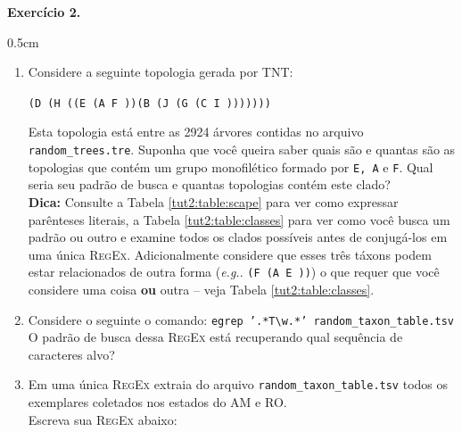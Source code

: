 \begin{refsection}
\begin{blackBlock}{\textbf{Exercício 2.}}\label{tut2:ex:2.\arabic{ex}}
\begin {myindentpar}{0.5cm}
\begin{enumerate}[\itshape i.]
 \item{Considere a seguinte topologia gerada por TNT:}\label{tut2:regex:modifiers:ex1}\\

\begin{center}
\texttt{(D (H ((E (A F ))(B (J (G (C I )))))))}\\
\end{center}

	Esta topologia está entre as 2924 árvores contidas no arquivo \texttt{random\_trees.tre}. Suponha que você queira saber quais são e quantas são as topologias que contém um grupo monofilético formado por \texttt{E, A} e \texttt{F}. Qual seria seu padrão de busca e quantas topologias contém este clado?\\
\textbf{Dica:} Consulte a Tabela \ref{tut2:table:scape} para ver como expressar parênteses literais, a Tabela \ref{tut2:table:classes} para ver como você busca um padrão ou outro e examine todos os clados possíveis antes de conjugá-los em uma única \textsc{RegEx}. Adicionalmente considere que esses três táxons podem estar relacionados de outra forma (\textit{e.g.}. \texttt{(F (A E ))}) o que requer que você considere uma coisa \textbf{ou} outra -- veja Tabela \ref{tut2:table:classes}.\\

 \item{Considere o seguinte o comando: \texttt{egrep '.*T\textbackslash w.*' random\_taxon\_table.tsv}}\label{tut2:regex:modifiers:ex2}\\
	O padrão de busca dessa \textsc{RegEx} está recuperando qual sequência de caracteres alvo?\\

 \item{Em uma única \textsc{RegEx} extraia do arquivo \texttt{random\_taxon\_table.tsv} todos os exemplares coletados nos estados do AM e RO.}\label{tut2:regex:modifiers:ex3}\\
	Escreva sua \textsc{RegEx} abaixo:\\

\\

\end{enumerate}
\end{myindentpar}
\end{blackBlock}


\end{refsection}
